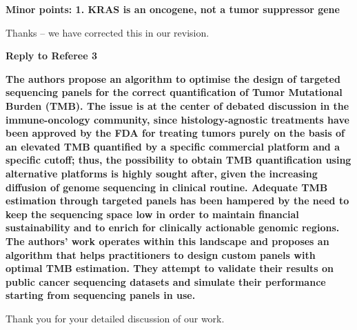 \documentclass[12pt]{article}
\begin{document}
\textbf{Minor points: 1. KRAS is an oncogene, not a tumor suppressor gene}

Thanks -- we have corrected this in our revision. 

\begin{thebibliography}{75}

\end{thebibliography}

\clearpage

{\large \textbf{Reply to Referee 3}}

\textbf{The authors propose an algorithm to optimise the design of targeted sequencing panels for the correct quantification of Tumor Mutational Burden (TMB). The issue is at the center of debated discussion in the immune-oncology community, since histology-agnostic treatments have been approved by the FDA for treating tumors purely on the basis of an elevated TMB quantified by a specific commercial platform and a specific cutoff; thus, the possibility to obtain TMB quantification using alternative platforms is highly sought after, given the increasing diffusion of genome sequencing in clinical routine. Adequate TMB estimation through targeted panels has been hampered by the need to keep the sequencing space low in order to maintain financial sustainability and to enrich for clinically actionable genomic regions. The authors’ work operates within this landscape and proposes an algorithm that helps practitioners to design custom panels with optimal TMB estimation. They attempt to
validate their results on public cancer sequencing datasets and simulate their performance starting from sequencing panels in use.}

Thank you for your detailed discussion of our work.  
\end{document}
